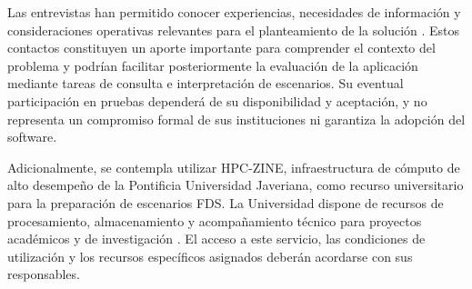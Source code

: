 Las entrevistas han permitido conocer experiencias, necesidades de información y consideraciones operativas relevantes para el planteamiento de la solución \cite{entrevistas2026}. Estos contactos constituyen un aporte importante para comprender el contexto del problema y podrían facilitar posteriormente la evaluación de la aplicación mediante tareas de consulta e interpretación de escenarios. Su eventual participación en pruebas dependerá de su disponibilidad y aceptación, y no representa un compromiso formal de sus instituciones ni garantiza la adopción del software.

Adicionalmente, se contempla utilizar HPC-ZINE, infraestructura de cómputo de alto desempeño de la Pontificia Universidad Javeriana, como recurso universitario para la preparación de escenarios FDS. La Universidad dispone de recursos de procesamiento, almacenamiento y acompañamiento técnico para proyectos académicos y de investigación \cite{vfpHPCZINE}. El acceso a este servicio, las condiciones de utilización y los recursos específicos asignados deberán acordarse con sus responsables.